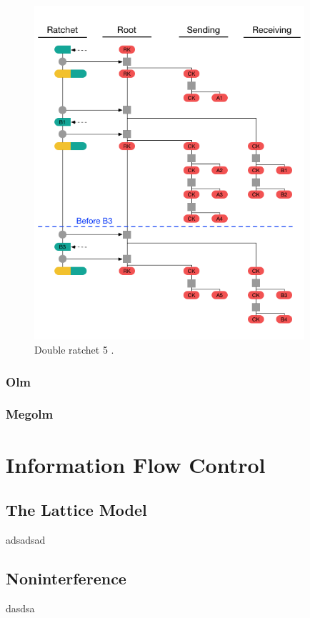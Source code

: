 \begin{figure}[H]
	\centering
	\includegraphics[width=10cm]{figures/doubleratchet5.png}
	\caption{Double ratchet 5 \cite{doubleratchet}.}
	\label{fig:doubleratchet5}
\end{figure}


\subsubsection{Olm}

\subsubsection{Megolm}



\section{Information Flow Control} %

\subsection{The Lattice Model}
adsadsad

\subsection{Noninterference}
dasdsa

